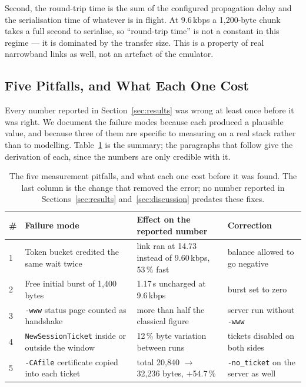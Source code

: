 \documentclass[drones,article,submit,pdftex,moreauthors]{Definitions/mdpi}
\newcommand{\kbps}{kbps}
\begin{document}
Second, the round-trip time is the sum of the configured propagation
delay and the serialisation time of whatever is in flight. At
9.6\,\kbps{} a 1{,}200-byte chunk takes a full second to serialise, so
``round-trip time'' is not a constant in this regime --- it is dominated
by the transfer size. This is a property of real narrowband links as
well, not an artefact of the emulator.

\subsection{Five Pitfalls, and What Each One Cost}
\label{sec:pitfalls}

Every number reported in Section~\ref{sec:results} was wrong at least
once before it was right. We document the failure modes because each
produced a plausible value, and because three of them are specific to
measuring on a real stack rather than to modelling.
Table~\ref{tab:pitfalls} is the summary; the paragraphs that follow give
the derivation of each, since the numbers are only credible with it.

\begin{table}[H]
\caption{The five measurement pitfalls, and what each one cost before it
was found. The last column is the change that removed the error; no
number reported in Sections~\ref{sec:results} and~\ref{sec:discussion}
predates these fixes.}
\label{tab:pitfalls}
\centering
\small
\begin{tabular}{@{}p{}p{}p{}p{}@{}}
\toprule
\# & Failure mode & Effect on the reported number & Correction \\
\midrule
1 & Token bucket credited the same wait twice & link ran at 14.73 instead of
9.60\,\kbps{}, 53\,\% fast & balance allowed to go negative \\
2 & Free initial burst of 1{,}400 bytes & 1.17\,s uncharged at
9.6\,\kbps{} & burst set to zero \\
3 & \texttt{-www} status page counted as handshake & more than half the
classical figure & server run without \texttt{-www} \\
4 & \texttt{NewSessionTicket} inside or outside the window & 12\,\% byte
variation between runs & tickets disabled on both sides \\
5 & \texttt{-CAfile} certificate copied into each ticket & total
20{,}840 $\to$ 32{,}236 bytes, $+$54.7\,\% & \texttt{-no\_ticket} on the
server as well \\
\bottomrule
\end{tabular}
\end{table}
\end{document}
